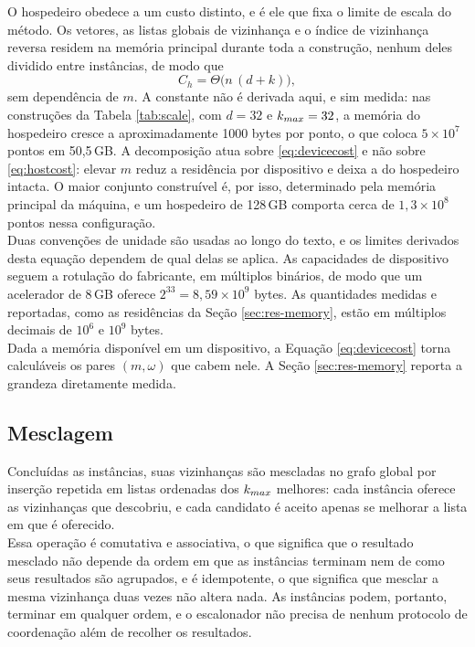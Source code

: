 O hospedeiro obedece a um custo distinto, e é ele que fixa o limite de escala do método. Os vetores, as listas globais de vizinhança e o índice de vizinhança reversa residem na memória principal durante toda a construção, nenhum deles dividido entre instâncias, de modo que
\begin{equation}
\label{eq:hostcost}
C_h = \Theta\bigl(n\,(d + k)\bigr),
\end{equation}
sem dependência de $m$. A constante não é derivada aqui, e sim medida: nas construções da Tabela \ref{tab:scale}, com $d = 32$ e $k_{max} = 32$, a memória do hospedeiro cresce a aproximadamente 1000 bytes por ponto, o que coloca $5 \times 10^7$ pontos em 50,5\,GB. A decomposição atua sobre \eqref{eq:devicecost} e não sobre \eqref{eq:hostcost}: elevar $m$ reduz a residência por dispositivo e deixa a do hospedeiro intacta. O maior conjunto construível é, por isso, determinado pela memória principal da máquina, e um hospedeiro de 128\,GB comporta cerca de $1{,}3 \times 10^8$ pontos nessa configuração.\\

Duas convenções de unidade são usadas ao longo do texto, e os limites derivados desta equação dependem de qual delas se aplica. As capacidades de dispositivo seguem a rotulação do fabricante, em múltiplos binários, de modo que um acelerador de 8\,GB oferece $2^{33} = 8{,}59 \times 10^9$ bytes. As quantidades medidas e reportadas, como as residências da Seção \ref{sec:res-memory}, estão em múltiplos decimais de $10^6$ e $10^9$ bytes.\\

Dada a memória disponível em um dispositivo, a Equação \eqref{eq:devicecost} torna calculáveis os pares $(m, \omega)$ que cabem nele. A Seção \ref{sec:res-memory} reporta a grandeza diretamente medida.\\

\subsection{Mesclagem\label{sec:merge}}

Concluídas as instâncias, suas vizinhanças são mescladas no grafo global por inserção repetida em listas ordenadas dos $k_{max}$ melhores: cada instância oferece as vizinhanças que descobriu, e cada candidato é aceito apenas se melhorar a lista em que é oferecido.\\

Essa operação é comutativa e associativa, o que significa que o resultado mesclado não depende da ordem em que as instâncias terminam nem de como seus resultados são agrupados, e é idempotente, o que significa que mesclar a mesma vizinhança duas vezes não altera nada. As instâncias podem, portanto, terminar em qualquer ordem, e o escalonador não precisa de nenhum protocolo de coordenação além de recolher os resultados.\\

